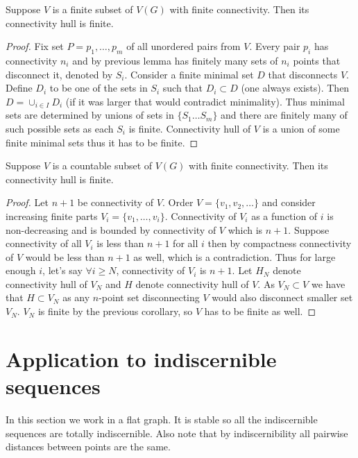 \documentclass{amsart}
\begin{document}
\begin{Corollary}
	Suppose $V$ is a finite subset of $V(G)$ with finite connectivity. Then its connectivity hull is finite.
\end{Corollary}

\begin{proof}
	Fix set $P = {p_1, \ldots, p_m}$ of all unordered pairs from $V$. Every pair $p_i$ has connectivity $n_i$ and by previous lemma has finitely many sets of $n_i$ points that disconnect it, denoted by $S_i$. Consider a finite minimal set $D$ that disconnects $V$. Define $D_i$ to be one of the sets in $S_i$ such that $D_i \subset D$ (one always exists). Then $D = \cup_{i \in I} D_i$ (if it was larger that would contradict minimality). Thus minimal sets are determined by unions of sets in $\{S_1 \ldots S_m\}$ and there are finitely many of such possible sets as each $S_i$ is finite. Connectivity hull of $V$ is a union of some finite minimal sets thus it has to be finite.
\end{proof}

\begin{Corollary}
	Suppose $V$ is a countable subset of $V(G)$ with finite connectivity. Then its connectivity hull is finite.
\end{Corollary}

\begin{proof}
	Let $n+1$ be connectivity of $V$. Order $V = \{v_1, v_2, \ldots\}$ and consider increasing finite parts $V_i = \{v_1, \dots, v_i\}$. Connectivity of $V_i$ as a function of $i$ is non-decreasing and is bounded by connectivity of $V$ which is $n+1$. Suppose connectivity of all $V_i$ is less than $n+1$ for all $i$ then by compactness connectivity of $V$ would be less than $n+1$ as well, which is a contradiction. Thus for large enough $i$, let's say $\forall i \geq N$, connectivity of $V_i$ is $n+1$. Let $H_N$ denote connectivity hull of $V_N$ and $H$ denote connectivity hull of $V$. As $V_N \subset V$ we have that $H \subset V_N$ as any $n$-point set disconnecting $V$ would also disconnect smaller set $V_N$. $V_N$ is finite by the previous corollary, so $V$ has to be finite as well.
\end{proof}

\section{Application to indiscernible sequences}

In this section we work in a flat graph. It is stable so all the indiscernible sequences are totally indiscernible. Also note that by indiscernibility all pairwise distances between points are the same.
\end{document}
